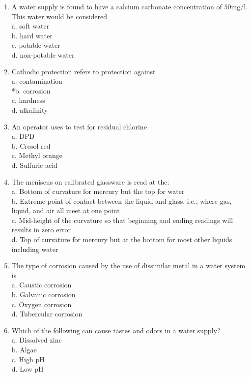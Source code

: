 \begin{enumerate}[1.]
\item A water supply is found to have a calcium carbonate concentration of $50 \mathrm{mg} / \mathrm{l}$. This water would be considered\\
a. soft water\\
b. hard water\\
c. potable water\\
d. non-potable water\\
\item Cathodic protection refers to protection against\\
a. contamination\\
*b. corrosion\\
c. hardness\\
d. alkalinity\\
\item An operator uses to test for residual chlorine\\
a. DPD\\
b. Cresol red\\
c. Methyl orange\\
d. Sulfuric acid\\
\item The meniscus on calibrated glassware is read at the:\\
a. Bottom of curvature for mercury but the top for water\\
b. Extreme point of contact between the liquid and glass, i.e., where gas, liquid, and air all meet at one point\\
c. Mid-height of the curvature so that beginning and ending readings will results in zero error\\
d. Top of curvature for mercury but at the bottom for most other liquids including water\\
\item The type of corrosion caused by the use of dissimilar metal in a water system is\\
a. Caustic corrosion\\
b. Galvanic corrosion\\
c. Oxygen corrosion\\
d. Tubercular corrosion\\
\item Which of the following can cause tastes and odors in a water supply?\\
a. Dissolved zinc\\
b. Algae\\
c. High $\mathrm{pH}$\\
d. Low $\mathrm{pH}$\\

\end{enumerate}
